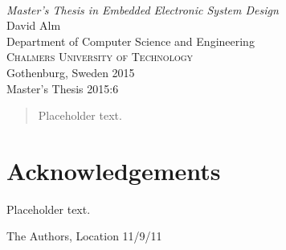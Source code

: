 
\begin{titlepage}

\mbox{}
\vfill
\addtolength{\voffset}{2cm}
\begin{flushleft}
	{ \\[0.5cm]
	\emph{\Large Master's Thesis in Embedded Electronic System Design} \\[.8cm]
	
	{\huge David Alm}\\[.8cm]
	
	{\Large Department of Computer Science and Engineering\\
	\textsc{Chalmers University of Technology} \\
	Gothenburg, Sweden 2015 \\
	Master's Thesis 2015:6\\
	} 
	}
\end{flushleft}

\end{titlepage}
\ClearShipoutPicture

\pagestyle{empty}
\newpage
\clearpage
\mbox{}
\newpage
\clearpage
\thispagestyle{empty}

\begin{abstract}
Placeholder text.
\end{abstract}

\newpage
\clearpage
\mbox{}
\newpage
\clearpage
\thispagestyle{empty}
\section*{Acknowledgements}
Placeholder text.

\hfill The Authors, Location 11/9/11
\newpage
\clearpage
\mbox{}
